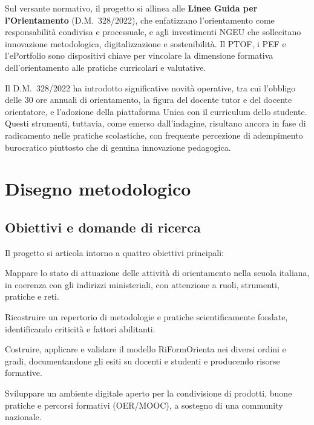 \documentclass[12pt,a4paper]{article}
\begin{document}
Sul versante normativo, il progetto si allinea alle \textbf{Linee Guida per l'Orientamento} (D.M.~328/2022), che enfatizzano l'orientamento come responsabilit\`a condivisa e processuale, e agli investimenti NGEU che sollecitano innovazione metodologica, digitalizzazione e sostenibilit\`a. Il PTOF, i PEF e l'ePortfolio sono dispositivi chiave per vincolare la dimensione formativa dell'orientamento alle pratiche curricolari e valutative.

Il D.M.~328/2022 ha introdotto significative novit\`a operative, tra cui l'obbligo delle 30 ore annuali di orientamento, la figura del docente tutor e del docente orientatore, e l'adozione della piattaforma Unica con il curriculum dello studente. Questi strumenti, tuttavia, come emerso dall'indagine, risultano ancora in fase di radicamento nelle pratiche scolastiche, con frequente percezione di adempimento burocratico piuttosto che di genuina innovazione pedagogica.


\section{Disegno metodologico}

\subsection{Obiettivi e domande di ricerca}

Il progetto si articola intorno a quattro obiettivi principali:

\begin{description}[style=nextline, leftmargin=0.5cm]
  \item[\textbf{O1}] Mappare lo stato di attuazione delle attivit\`a di orientamento nella scuola italiana, in coerenza con gli indirizzi ministeriali, con attenzione a ruoli, strumenti, pratiche e reti.
  \item[\textbf{O2}] Ricostruire un repertorio di metodologie e pratiche scientificamente fondate, identificando criticit\`a e fattori abilitanti.
  \item[\textbf{O3}] Costruire, applicare e validare il modello RiFormOrienta nei diversi ordini e gradi, documentandone gli esiti su docenti e studenti e producendo risorse formative.
  \item[\textbf{O4}] Sviluppare un ambiente digitale aperto per la condivisione di prodotti, buone pratiche e percorsi formativi (OER/MOOC), a sostegno di una community nazionale.
\end{description}
\end{document}
